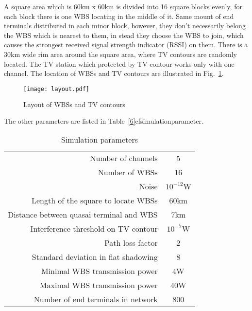 A square area which is 60km x 60km is divided into 16 square blocks evenly, for each block there is one WBS locating in the middle of it. 
Same mount of end terminals distributed in each minor block, however, they don't necessarily belong the WBS which is nearest to them, in stead they choose the WBS to join, which causes the strongest received signal strength indicator (RSSI) on them.
There is a 30km wide rim area around the square area, where TV contours are randomly located.
The TV station which protected by TV contour works only with one channel. 
The location of WBSs and TV contours are illustrated in Fig.~\ref{sim:layout}.
\begin{figure}[h!]
  \centering
  \texttt{[image: layout.pdf]}
  \caption{Layout of WBSs and TV contours}
  \label{sim:layout}
\end{figure}
The other parameters are listed in Table~\ref{6}ef{simulationparameter}. 

\begin{table}[!h]
\caption{}\label{simulationparameter}
\centering

\begin{tabular}{|r|c|}
  \hline
  Number of channels 						& 5 \\
  Number of WBSs							& 16\\
  Noise 									& $10^{-12}$W \\ %
  Length of the square to locate WBSs		& 60km\\
  Distance between quasai terminal and WBS 	& 7km \\
  Interference threshold on TV contour 		& $10^{-7}$W \\ %
  Path loss factor 							& 2 \\
  Standard deviation in flat shadowing		& 8\\
  Minimal WBS transmission power 			& 4W \\
  Maximal WBS transmission power 			& 40W \\
  Number of end terminals in network 		& 800 \\
  
  \hline
\end{tabular}
\caption{Simulation parameters}
\end{table}

